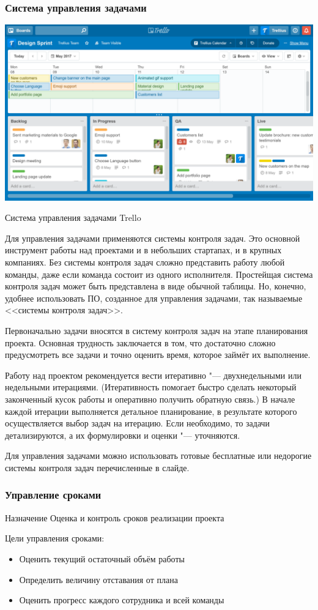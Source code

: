 \documentclass{../industrial-development}
\begin{document}
\begin{frame} \frametitle{Система управления задачами}
	\centerline{\includegraphics[width=1\textwidth]{trello.png}}
	\centerline{Система управления задачами Trello}
\end{frame}
\lecturenotes

Для управления задачами применяются системы контроля задач. Это основной инструмент работы над проектами и в небольших стартапах, и в крупных компаниях. Без системы контроля задач сложно представить работу любой команды, даже если команда состоит из одного исполнителя. Простейщая система контроля задач может быть представлена в виде обычной таблицы. Но, конечно, удобнее использовать ПО, созданное для управления задачами, так называемые <<системы контроля задач>>.

Первоначально задачи вносятся в систему контроля задач на этапе планирования проекта. Основная трудность заключается в том, что достаточно сложно предусмотреть все задачи и точно оценить время, которое займёт их выполнение.

Работу над проектом рекомендуется вести итеративно "--- двухнедельными или недельными итерациями. (Итеративность помогает быстро сделать некоторый законченный кусок работы и оперативно получить обратную связь.) В начале каждой итерации выполняется детальное планирование, в результате которого осуществляется выбор задач на итерацию. Если необходимо, то задачи детализируются, а их формулировки и оценки "--- уточняются.

Для управления задачами можно использовать готовые бесплатные или недорогие системы контроля задач перечисленные в слайде.

\begin{frame} \frametitle{Управление сроками}
	\begin{block}{Назначение}
		Оценка и контроль сроков реализации проекта
	\end{block}
	Цели управления сроками:
	\begin{itemize}
		\item Оценить текущий остаточный объём работы
		\item Определить величину отставания от плана
		\item Оценить прогресс каждого сотрудника и всей команды
	\end{itemize}
\end{frame}
\lecturenotes
\end{document}

